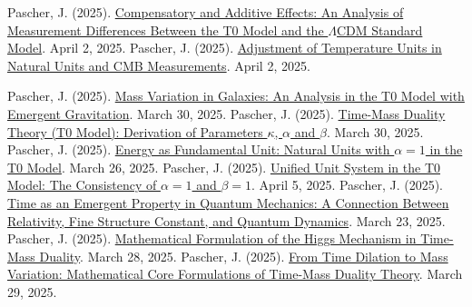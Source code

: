 ﻿\documentclass[12pt,a4paper]{article}
\begin{document}
	\begin{thebibliography}{99}
		 Pascher, J. (2025). \href{https://github.com/jpascher/T0-Time-Mass-Duality/tree/main/2/pdf/English/MessdifferenzenT0StandardEn.pdf}{Compensatory and Additive Effects: An Analysis of Measurement Differences Between the T0 Model and the \(\Lambda\)CDM Standard Model}. April 2, 2025.
		 Pascher, J. (2025). \href{https://github.com/jpascher/T0-Time-Mass-Duality/tree/main/2/pdf/English/TempEinheitenCMBEn.pdf}{Adjustment of Temperature Units in Natural Units and CMB Measurements}. April 2, 2025.
		
		
		
		
		 Pascher, J. (2025). \href{https://github.com/jpascher/T0-Time-Mass-Duality/tree/main/2/pdf/English/MassVarGalaxienEn.pdf}{Mass Variation in Galaxies: An Analysis in the T0 Model with Emergent Gravitation}. March 30, 2025.
		 Pascher, J. (2025). \href{https://github.com/jpascher/T0-Time-Mass-Duality/tree/main/2/pdf/English/ZeitMasseT0ParamsEn.pdf}{Time-Mass Duality Theory (T0 Model): Derivation of Parameters \(\kappa\), \(\alpha\) and \(\beta\)}. March 30, 2025.
		 Pascher, J. (2025). \href{https://github.com/jpascher/T0-Time-Mass-Duality/tree/main/2/pdf/English/NatEinheitenAlpha1En.pdf}{Energy as Fundamental Unit: Natural Units with \(\alpha = 1\) in the T0 Model}. March 26, 2025.
		 Pascher, J. (2025). \href{https://github.com/jpascher/T0-Time-Mass-Duality/tree/main/2/pdf/English/Alpha1Beta1KonsistenzEn.pdf}{Unified Unit System in the T0 Model: The Consistency of \(\alpha = 1\) and \(\beta = 1\)}. April 5, 2025.
		 Pascher, J. (2025). \href{https://github.com/jpascher/T0-Time-Mass-Duality/tree/main/2/pdf/English/ZeitEmergentQMEn.pdf}{Time as an Emergent Property in Quantum Mechanics: A Connection Between Relativity, Fine Structure Constant, and Quantum Dynamics}. March 23, 2025.
		 Pascher, J. (2025). \href{https://github.com/jpascher/T0-Time-Mass-Duality/tree/main/2/pdf/English/MathHiggsZeitMasseEn.pdf}{Mathematical Formulation of the Higgs Mechanism in Time-Mass Duality}. March 28, 2025.
		 Pascher, J. (2025). \href{https://github.com/jpascher/T0-Time-Mass-Duality/tree/main/2/pdf/English/MathZeitMasseLagrange.pdf}{From Time Dilation to Mass Variation: Mathematical Core Formulations of Time-Mass Duality Theory}. March 29, 2025.
		

\end{thebibliography}
\end{document}
